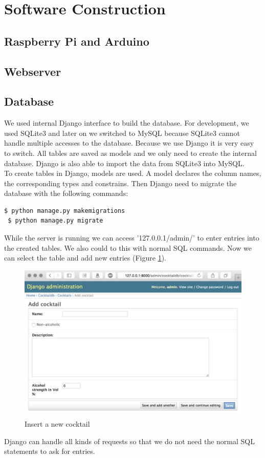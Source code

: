 \documentclass{acm_proc_article-sp}
\begin{document}
\section{Software Construction}
\subsection{Raspberry Pi and Arduino}
\subsection{Webserver}\label{sec:webserver}

\subsection{Database}
We used internal Django interface to build the database. For development, we used SQLite3 and later on we switched to MySQL because SQLite3 cannot handle multiple accesses to the database. Because we use Django it is very easy to switch. All tables are saved as models and we only need to create the internal database. Django is also able to import the data from SQLite3 into MySQL. \\
To create tables in Django, models are used. A model declares the column names, the corresponding types and constrains. Then Django need to migrate the database with the following commands:
\begin{lstlisting}[language=bash]
 $ python manage.py makemigrations
 $ python manage.py migrate
\end{lstlisting}
While the server is running we can access '127.0.0.1/admin/' to enter entries into the created tables. We also could to this with normal SQL commands. Now we can select the table and add new entries (Figure \ref{fig:db_entry}). \\
\begin{figure}[htbp] 
 \centering
    \includegraphics[width=0.7\linewidth]{pictures/db_insert_entry.png}
 \caption{Insert a new cocktail}
 \label{fig:db_entry}
\end{figure}
Django can handle all kinds of requests so that we do not need the normal SQL statements to ask for entries.
\end{document}
